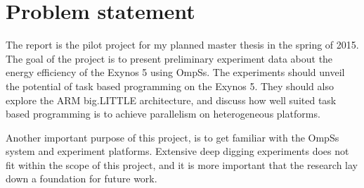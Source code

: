 \section*{Problem statement}
The report is the pilot project for my planned master thesis in the spring of 2015.
The goal of the project is to present preliminary experiment data about the energy efficiency of the Exynos 5 using OmpSs.
The experiments should unveil the potential of task based programming on the Exynos 5.
They should also explore the ARM big.LITTLE architecture, and discuss how well suited task based programming is to achieve parallelism on heterogeneous platforms.

Another important purpose of this project, is to get familiar with the OmpSs system and experiment platforms.
Extensive deep digging experiments does not fit within the scope of this project, and it is more important that the research lay down a foundation for future work.
